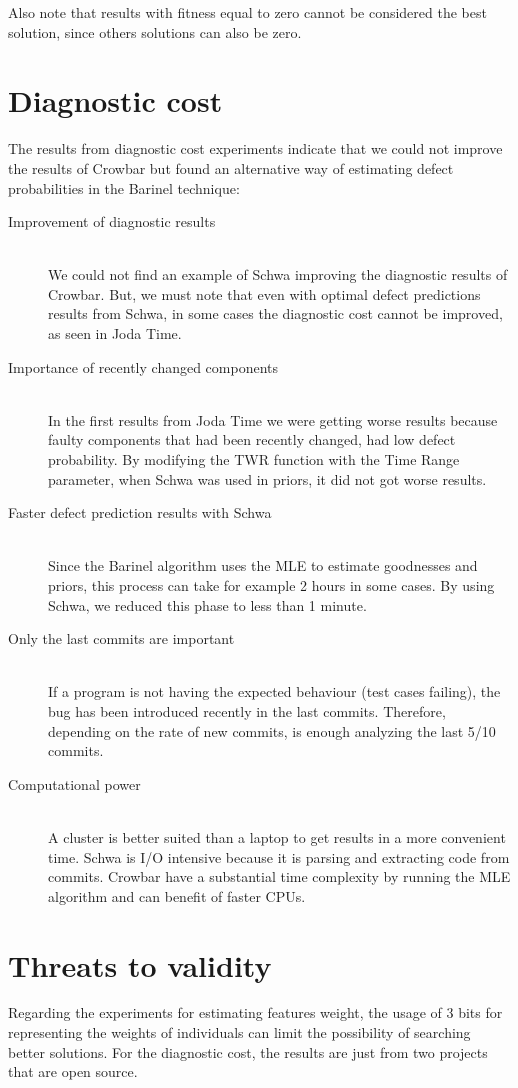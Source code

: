Also note that results with fitness equal to zero cannot be considered the best solution, since others solutions can also be zero.

\section{Diagnostic cost}
The results from diagnostic cost experiments indicate that we could not improve the results of Crowbar but found an alternative way of estimating defect probabilities in the Barinel technique:

\begin{description}
\item[Improvement of diagnostic results] \hfill \\
We could not find an example of Schwa improving the diagnostic results of Crowbar. But, we must note that even with optimal defect predictions results from Schwa, in some cases the diagnostic cost cannot be improved, as seen in Joda Time.

\item[Importance of recently changed components] \hfill \\
In the first results from Joda Time we were getting worse results because faulty components that had been recently changed, had low defect probability. By modifying the TWR function with the Time Range parameter, when Schwa was used in priors, it did not got worse results.

\item[Faster defect prediction results with Schwa] \hfill \\
Since the Barinel algorithm uses the MLE to estimate goodnesses and priors, this process can take for example 2 hours in some cases. By using Schwa, we reduced this phase to less than 1 minute.

\item[Only the last commits are important] \hfill \\
If a program is not having the expected behaviour (test cases failing), the bug has been introduced recently in the last commits. Therefore, depending on the rate of new commits, is enough analyzing the last 5/10 commits.

\item[Computational power] \hfill \\
A cluster is better suited than a laptop to get results in a more convenient time. Schwa is I/O intensive because it is parsing and extracting code from commits. Crowbar have a substantial time complexity by running the MLE algorithm and can benefit of faster CPUs.

\end{description}

\section{Threats to validity}
Regarding the experiments for estimating features weight, the usage of 3 bits for representing the weights of individuals can limit the possibility of searching better solutions. For the diagnostic cost, the results are just from two projects that are open source.